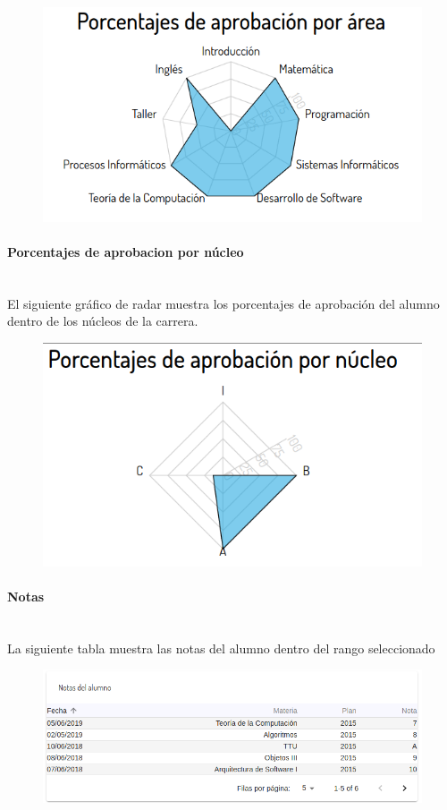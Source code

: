 \begin{figure}[!htbp]
  \centering
    \includegraphics[scale=0.4]{images/seguimiento-academico/sa-porcentajesarea.png}
  \label{fig:sa-porcentaje-area}
\end{figure}

\paragraph{Porcentajes de aprobacion por núcleo} \mbox{}\\
El siguiente gráfico de radar muestra los porcentajes de aprobación del alumno dentro de los núcleos de la carrera.

\begin{figure}[!htbp]
  \centering
    \includegraphics[scale=0.4]{images/seguimiento-academico/sa-porcentajesnucleo.png}
  \label{fig:sa-porcentaje-nucleo}
\end{figure}

\paragraph{Notas} \mbox{}\\
La siguiente tabla muestra las notas del alumno dentro del rango seleccionado

\begin{figure}[!htbp]
  \centering
    \includegraphics[scale=0.4]{images/seguimiento-academico/sa-notas.png}
  \label{fig:sa-notas}
\end{figure}
